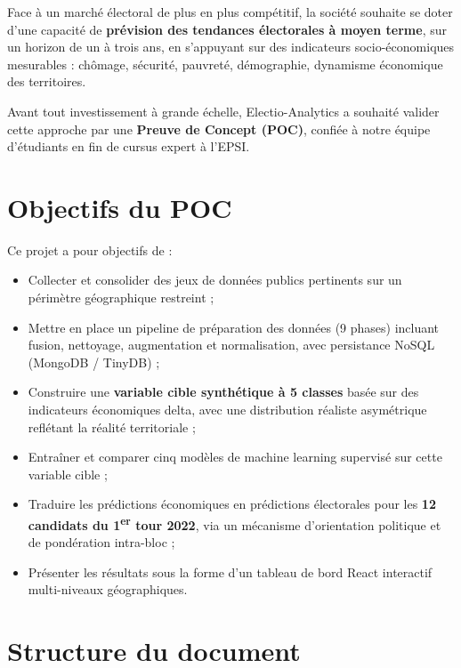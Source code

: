 \documentclass[12pt,a4paper,oneside]{report}
\begin{document}
Face à un marché électoral de plus en plus compétitif, la société souhaite se doter d'une capacité de \textbf{prévision des tendances électorales à moyen terme}, sur un horizon de un à trois ans, en s'appuyant sur des indicateurs socio-économiques mesurables : chômage, sécurité, pauvreté, démographie, dynamisme économique des territoires.

Avant tout investissement à grande échelle, Electio-Analytics a souhaité valider cette approche par une \textbf{Preuve de Concept (POC)}, confiée à notre équipe d'étudiants en fin de cursus expert à l'EPSI.

\section*{Objectifs du POC}

Ce projet a pour objectifs de :
\begin{itemize}
  \item Collecter et consolider des jeux de données publics pertinents sur un périmètre géographique restreint ;
  \item Mettre en place un pipeline de préparation des données (9 phases) incluant fusion, nettoyage, augmentation et normalisation, avec persistance NoSQL (MongoDB / TinyDB) ;
  \item Construire une \textbf{variable cible synthétique à 5 classes} basée sur des indicateurs économiques delta, avec une distribution réaliste asymétrique reflétant la réalité territoriale ;
  \item Entraîner et comparer cinq modèles de machine learning supervisé sur cette variable cible ;
  \item Traduire les prédictions économiques en prédictions électorales pour les \textbf{12 candidats du 1\textsuperscript{er} tour 2022}, via un mécanisme d'orientation politique et de pondération intra-bloc ;
  \item Présenter les résultats sous la forme d'un tableau de bord React interactif multi-niveaux géographiques.
\end{itemize}

\section*{Structure du document}
\end{document}
